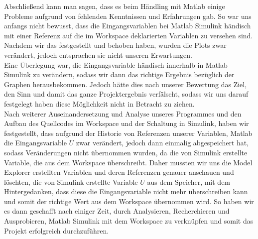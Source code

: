 \label{Fazit}

Abschließend kann man sagen, dass es beim Händling mit Matlab einige Probleme aufgrund von fehlenden Kenntnissen und Erfahrungen gab. So war uns anfangs nicht bewusst, dass die Eingangsvariablen bei Matlab Simulink händisch mit einer Referenz auf die im Workspace deklarierten Variablen zu versehen sind. Nachdem wir das festgestellt und behoben haben, wurden die Plots zwar verändert, jedoch entsprachen sie nicht unseren Erwartungen. \\
Eine Überlegung war, die Eingangsvariable händisch innerhalb in Matlab Simulink zu verändern, sodass wir dann das richtige Ergebnis bezüglich der Graphen herausbekommen. Jedoch hätte dies nach unserer Bewertung das Ziel, den Sinn und damit das ganze Projektergebnis verfälscht, sodass wir uns darauf festgelegt haben diese Möglichkeit nicht in Betracht zu ziehen. \\
Nach weiterer Auseinandersetzung und Analyse unseres Programmes und den Aufbau des Quellcodes im Workspace und der Schaltung in Simulink, haben wir festgestellt, dass aufgrund der Historie von Referenzen unserer Variablen, Matlab die Eingangsvariable $U$ zwar verändert, jedoch dann einmalig abgespeichert hat, sodass Veränderungen nicht übernommen wurden, da die von Simulink erstellte Variable, die aus dem Workspace überschreibt. Daher mussten wir uns die Model Explorer erstellten Variablen und deren Referenzen genauer anschauen und löschten, die von Simulink erstellte Variable $U$ aus dem Speicher, mit dem Hintergedanken, dass diese die Eingangsvariable nicht mehr überschreiben kann und somit der richtige Wert aus dem Workspace übernommen wird. So haben wir es dann geschafft nach einiger Zeit, durch Analysieren, Recherchieren und Ausprobieren, Matlab Simulink mit dem Workspace zu verknüpfen und somit das Projekt erfolgreich durchzuführen. \\